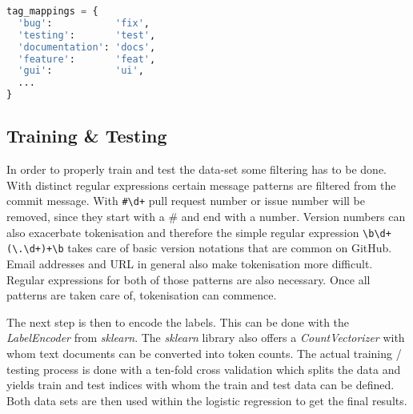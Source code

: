 \begin{lstlisting}[language=python, label={lst:tag_map}, caption={Dictionary for conventional tag mappings}]
tag_mappings = {
  'bug':           'fix',
  'testing':       'test',
  'documentation': 'docs',
  'feature':       'feat',
  'gui':           'ui',
  ...
}
\end{lstlisting}

\subsection{Training \& Testing}

In order to properly train and test the data-set some filtering has to be done.
With distinct regular expressions certain message patterns are filtered from
the commit message. With \lstinline{#\d+} pull request number or issue number
will be removed, since they start with a \# and end with a number. Version
numbers can also exacerbate tokenisation and therefore the simple regular
expression \lstinline{\b\d+(\.\d+)+\b} takes care of basic version notations
that are common on GitHub. Email addresses and URL in general also make
tokenisation more difficult. Regular expressions for both of those patterns are
also necessary. Once all patterns are taken care of, tokenisation can commence.

The next step is then to encode the labels. This can be done  with the
\textit{LabelEncoder} from \textit{sklearn}. The \textit{sklearn} library also
offers a \textit{CountVectorizer} with whom text documents can be converted
into token counts. The actual training / testing process is done with a
ten-fold cross validation which splits the data and yields train and test
indices with whom the train and test data can be defined. Both data sets are
then used within the logistic regression to get the final results.
